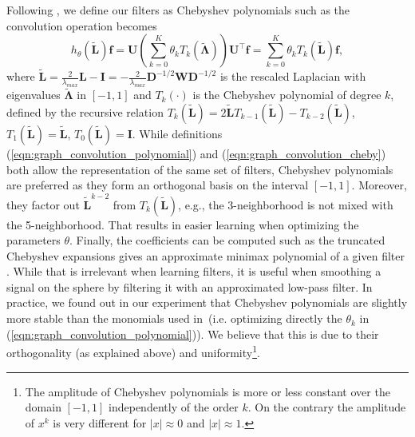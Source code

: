 \documentclass[final,twocolumn,3p,times,authoryear]{elsarticle}
\newcommand{\nati}[1]{{\color[rgb]{.1,.6,.1}{#1}}}
\newcommand{\todo}[1]{{\color[rgb]{.6,.1,.6}{#1}}}
\newcommand{\eqnref}[1]{(\ref{eqn:#1})}
\renewcommand{\b}[1]{{\bm{#1}}}   %
\newcommand{\1}{\b{1}}              %
\newcommand{\0}{\b{0}}              %
\renewcommand{\L}{\b{L}}
\newcommand{\tL}{\tilde{\L}}
\newcommand{\W}{\b{W}}
\newcommand{\D}{\b{D}}
\newcommand{\U}{\b{U}}
\newcommand{\f}{\b{f}}
\newcommand{\trans}{^\intercal}
\newcommand{\bLambda}{\b{\Lambda}}
\begin{document}
Following \citet{defferrard2016convolutional}, we define our filters as Chebyshev polynomials such as the convolution operation becomes
\begin{equation} \label{eqn:graph_convolution_cheby}
	h_\theta\left(\tL\right) \f = \U \left(\sum_{k=0}^K \theta_k T_k\left(\tilde{\bLambda}\right) \right) \U\trans \f = \sum_{k=0}^K \theta_k T_k\left(\tL\right) \f,
\end{equation}
where $\tL = \frac{2}{\lambda_{max}} \L - \b{I} = -\frac{2}{\lambda_{max}} \D^{-1/2} \W \D^{-1/2}$ is the rescaled Laplacian with eigenvalues $\tilde{\b \Lambda}$ in $[-1, 1]$ and $T_k(\cdot)$ is the Chebyshev polynomial of degree $k$, defined by the recursive relation $T_k(\tL) = 2\tL T_{k-1}(\tL) - T_{k-2}(\tL)$, $T_1(\tL) = \tL$, $T_0(\tL) = \b{I}$. While definitions \eqnref{graph_convolution_polynomial} and \eqnref{graph_convolution_cheby} both allow the representation of the same set of filters, Chebyshev polynomials are preferred as they form an orthogonal basis on the interval $[-1, 1]$. Moreover, they factor out $\tL^{k-2}$ from $T_k(\tL)$, e.g., the 3-neighborhood is not mixed with the 5-neighborhood. That results in easier learning when optimizing the parameters $\theta$.
Finally, the coefficients can be computed such as the truncated Chebyshev expansions gives an approximate minimax polynomial of a given filter \citep{hammond2011wavelets}. While that is irrelevant when learning filters, it is useful when smoothing a signal on the sphere by filtering it with an approximated low-pass filter.
In practice, we found out in our experiment that Chebyshev polynomials are slightly more stable than the monomials used in~\cite{khasanova2017graphomni}(i.e. optimizing directly the $\theta_k$ in \eqnref{graph_convolution_polynomial}).
We believe that this is due to their orthogonality (as explained above) and uniformity\footnote{The amplitude of Chebyshev polynomials is more or less constant over the domain $[-1, 1]$ independently of the order $k$. On the contrary the amplitude of $x^k$ is very different for $|x|\approx 0$ and $|x| \approx 1$.}.
\end{document}
